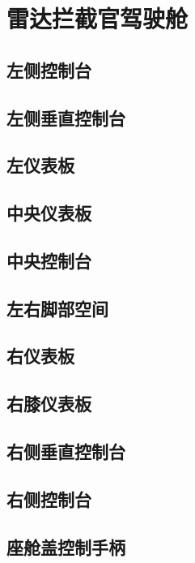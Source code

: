 \section{雷达拦截官驾驶舱}

\subsection{左侧控制台}

\subsection{左侧垂直控制台}

\subsection{左仪表板}

\subsection{中央仪表板}

\subsection{中央控制台}


\subsection{左右脚部空间}

\subsection{右仪表板}

\subsection{右膝仪表板}

\subsection{右侧垂直控制台}

\subsection{右侧控制台}

\subsection{座舱盖控制手柄}

